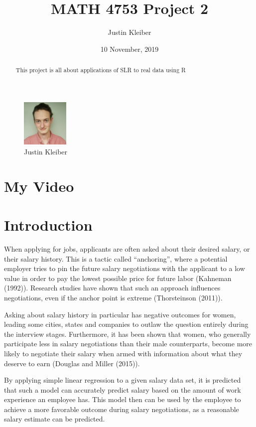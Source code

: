 \documentclass[]{article}
\title{MATH 4753 Project 2}
\author{Justin Kleiber}
\date{10 November, 2019}
\begin{document}
\maketitle
\begin{abstract}
This project is all about applications of SLR to real data using R
\end{abstract}

{
\setcounter{tocdepth}{4}
\tableofcontents
}
\begin{figure}
\centering
\includegraphics[width=0.2\textwidth,height=\textheight]{justin.jpg}
\caption{Justin Kleiber}
\end{figure}

\hypertarget{my-video}{%
\section{My Video}\label{my-video}}

\hypertarget{introduction}{%
\section{Introduction}\label{introduction}}

When applying for jobs, applicants are often asked about their desired
salary, or their salary history. This is a tactic called ``anchoring'',
where a potential employer tries to pin the future salary negotiations
with the applicant to a low value in order to pay the lowest possible
price for future labor (Kahneman (1992)). Research studies have shown
that such an approach influences negotiations, even if the anchor point
is extreme (Thorsteinson (2011)).

Asking about salary history in particular has negative outcomes for
women, leading some cities, states and companies to outlaw the question
entirely during the interview stages. Furthermore, it has been shown
that women, who generally participate less in salary negotiations than
their male counterparts, become more likely to negotiate their salary
when armed with information about what they deserve to earn (Douglas and
Miller (2015)).

By applying simple linear regression to a given salary data set, it is
predicted that such a model can accurately predict salary based on the
amount of work experience an employee has. This model then can be used
by the employee to achieve a more favorable outcome during salary
negotiations, as a reasonable salary estimate can be predicted.
\end{document}
